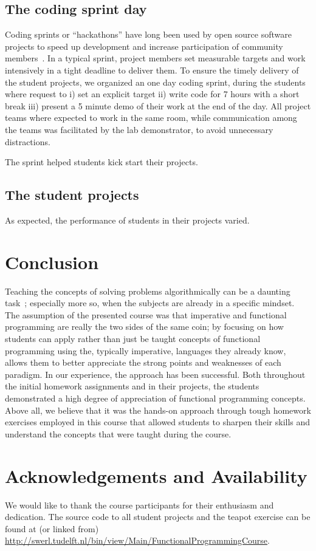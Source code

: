 \documentclass[conference]{IEEEtran}
\begin{document}
\subsection{The coding sprint day}

Coding sprints or ``hackathons'' have long been used by open source software
projects to speed up development and increase participation of community
members~\cite{Adams11}. In a typical sprint, project members set measurable
targets and work intensively in a tight deadline to deliver them. To ensure
the timely delivery of the student projects, we organized an one day
coding sprint, during the students where request to i) set an explicit target 
ii) write code for 7 hours with a short break iii) present a 5 minute 
demo of their work at the end of the day. All project teams where expected to
work in the same room, while communication among the teams was facilitated
by the lab demonstrator, to avoid unnecessary distractions.

The sprint helped students kick start their projects.  

\subsection{The student projects}

As expected, the performance of students in their projects varied.

\section{Conclusion}

Teaching the concepts of solving problems algorithmically can be a daunting
task~\cite{Futsc06}; especially more so, when the subjects are already in a
specific mindset. The assumption of the presented course was that imperative and
functional programming are really the two sides of the same coin; by focusing on
how students can apply rather than just be taught concepts of functional
programming using the, typically imperative, languages they already know, allows
them to better appreciate the strong points and weaknesses of each paradigm. In
our experience, the approach has been successful. Both throughout the initial
homework assignments and in their projects, the students demonstrated a high
degree of appreciation of functional programming concepts. Above all, we
believe that it was the hands-on approach through tough homework exercises
employed in this course that allowed students to sharpen their skills and
understand the concepts that were taught during the course.

\section*{Acknowledgements and Availability}

We would like to thank the course participants for their enthusiasm and
dedication. The source code to all student projects and the teapot
exercise can be found at (or linked from) \url{http://swerl.tudelft.nl/bin/view/Main/FunctionalProgrammingCourse}. 



\end{document}
